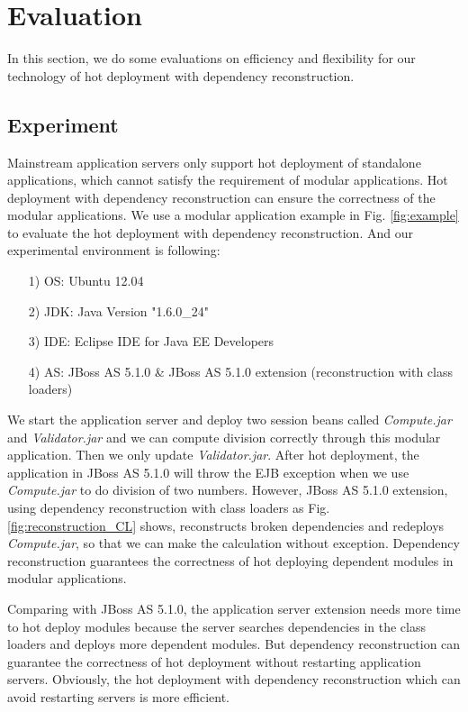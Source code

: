\documentclass[conference]{IEEEtran}
\begin{document}


\section{Evaluation\label{sec:evaluation}}
In this section, we do some evaluations on efficiency and flexibility for our technology of hot deployment with dependency reconstruction.

\subsection{Experiment}
Mainstream application servers only support hot deployment of standalone applications, which cannot satisfy the requirement of modular applications.
Hot deployment with dependency reconstruction can ensure the correctness of the modular applications.
We use a modular application example in Fig. \ref{fig:example} to evaluate the hot deployment with dependency reconstruction.
And our experimental environment is following:
\begin{itemize}[]
\item[1)] OS: Ubuntu 12.04
\item[2)] JDK: Java Version "1.6.0\_24"
\item[3)] IDE: Eclipse IDE for Java EE Developers
\item[4)] AS: JBoss AS 5.1.0 \& JBoss AS 5.1.0 extension (reconstruction with class loaders)
\end{itemize}

We start the application server and deploy two session beans called \emph{Compute.jar} and \emph{Validator.jar} and we can compute division correctly through this modular application.
Then we only update \emph{Validator.jar}.
After hot deployment, the application in JBoss AS 5.1.0 will throw the EJB exception when we use \emph{Compute.jar} to do division of two numbers.
However, JBoss AS 5.1.0 extension, using dependency reconstruction with class loaders as Fig. \ref{fig:reconstruction_CL} shows, reconstructs broken dependencies and redeploys \emph{Compute.jar}, so that we can make the calculation without exception.
Dependency reconstruction guarantees the correctness of hot deploying dependent modules in modular applications.

Comparing with JBoss AS 5.1.0, the application server extension needs more time to hot deploy modules because the server searches dependencies in the class loaders and deploys more dependent modules.
But dependency reconstruction can guarantee the correctness of hot deployment without restarting application servers.
Obviously, the hot deployment with dependency reconstruction which can avoid restarting servers is more efficient.
\end{document}
